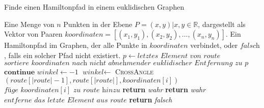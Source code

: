 \documentclass[a4paper,10pt,ngerman]{scrartcl}
\begin{document}
    \begin{algorithm}
        \caption{Finde einen Hamiltonpfad in einem euklidischen Graphen}
        \begin{algorithmic}
            \Require Eine Menge von $n$ Punkten in der Ebene $P={(x,y)| x,y \in \mathbb{R}}$, dargestellt als Vektor von Paaren $\textit{koordinaten}=[(x_1,y_1), (x_2,y_2),\dots, (x_n,y_n)]$.
            \Ensure Ein Hamiltonpfad im Graphen, der alle Punkte in $\textit{koordinaten}$ verbindet, oder $\textit{falsch}$, falls ein solcher Pfad nicht existiert.
                    \State $p\gets \textit{letztes Element von } \textit{route}$
                    \State $\textit{sortiere } \textit{koordinaten } \textit{nach nicht abnehmender euklidischer Entfernung zu } p$
                \EndIf
                        \State $\textbf{continue}$
                    \EndIf
                    \State $\textit{winkel}\gets -1$
                        \State $\textit{winkel}\gets$ \textsc{CrossAngle}$(\textit{route}[|\textit{route}|-1], \textit{route}[|\textit{route}|], \textit{koordinaten}[i])$
                    \EndIf
                        \State $\textit{füge }\textit{koordinaten}[i]\textit{ zu route hinzu}$
                            \State \textbf{return} \textit{wahr}
                        \EndIf
                            \State \textbf{return} \textit{wahr}
                        \Else
                            \State $\textit{entferne das letzte Element aus route}$
                        \EndIf
                    \EndIf
                \EndFor
                \State \textbf{return} \textit{falsch}
            \EndFunction
        \end{algorithmic}\label{alg:algorithm3}
    \end{algorithm}
\end{document}

